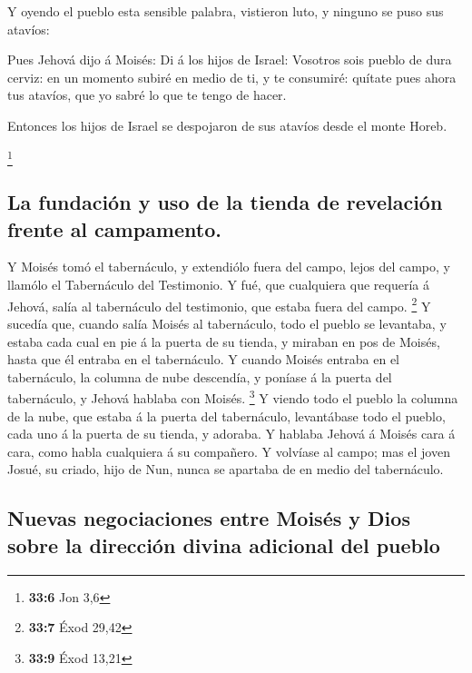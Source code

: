  Y oyendo el pueblo esta sensible palabra, vistieron luto, y
ninguno se puso sus atavíos:

 Pues Jehová dijo á Moisés: Di á los hijos de Israel:
Vosotros sois pueblo de dura cerviz: en un momento subiré en medio de
ti, y te consumiré: quítate pues ahora tus atavíos, que yo sabré lo que
te tengo de hacer.

 Entonces los hijos de Israel se despojaron de sus atavíos
desde el monte Horeb.

\footnote{\textbf{33:6} Jon 3,6}

\hypertarget{la-fundaciuxf3n-y-uso-de-la-tienda-de-revelaciuxf3n-frente-al-campamento.}{%
\subsection{La fundación y uso de la tienda de revelación frente al
campamento.}\label{la-fundaciuxf3n-y-uso-de-la-tienda-de-revelaciuxf3n-frente-al-campamento.}}

 Y Moisés tomó el tabernáculo, y extendiólo fuera del campo,
lejos del campo, y llamólo el Tabernáculo del Testimonio. Y fué, que
cualquiera que requería á Jehová, salía al tabernáculo del testimonio,
que estaba fuera del campo. \footnote{\textbf{33:7} Éxod 29,42}
 Y sucedía que, cuando salía Moisés al tabernáculo, todo el
pueblo se levantaba, y estaba cada cual en pie á la puerta de su tienda,
y miraban en pos de Moisés, hasta que él entraba en el tabernáculo.
 Y cuando Moisés entraba en el tabernáculo, la columna de
nube descendía, y poníase á la puerta del tabernáculo, y Jehová hablaba
con Moisés. \footnote{\textbf{33:9} Éxod 13,21}  Y viendo
todo el pueblo la columna de la nube, que estaba á la puerta del
tabernáculo, levantábase todo el pueblo, cada uno á la puerta de su
tienda, y adoraba.  Y hablaba Jehová á Moisés cara á cara,
como habla cualquiera á su compañero. Y volvíase al campo; mas el joven
Josué, su criado, hijo de Nun, nunca se apartaba de en medio del
tabernáculo.

\hypertarget{nuevas-negociaciones-entre-moisuxe9s-y-dios-sobre-la-direcciuxf3n-divina-adicional-del-pueblo}{%
\subsection{Nuevas negociaciones entre Moisés y Dios sobre la dirección
divina adicional del
pueblo}\label{nuevas-negociaciones-entre-moisuxe9s-y-dios-sobre-la-direcciuxf3n-divina-adicional-del-pueblo}}

